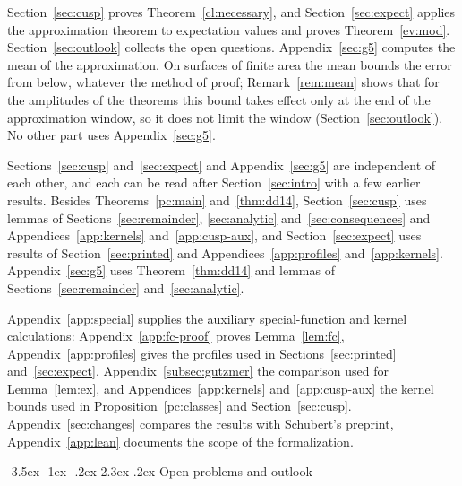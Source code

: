 \documentclass[twoside,10pt]{article}
\makeatletter
\numberwithin{equation}{section}
\theoremstyle{slbody}
\theoremstyle{remark}
\renewcommand{\section}{%
  \@startsection{section}{1}{\z@}%
    {-3.5ex \@plus -1ex \@minus -.2ex}%
    {2.3ex \@plus .2ex}%
    {\normalfont\large\bfseries}}
\makeatother
\begin{document}
Section~\ref{sec:cusp} proves Theorem~\ref{cl:necessary}, and Section~\ref{sec:expect} applies the approximation theorem to
expectation values and proves Theorem~\ref{ev:mod}. Section~\ref{sec:outlook} collects the open questions.
Appendix~\ref{sec:g5} computes the mean of the approximation. On surfaces of finite area the mean bounds the error from below,
whatever the method of proof; Remark~\ref{rem:mean} shows that for the amplitudes of the theorems this bound takes effect only at
the end of the approximation window, so it does not limit the window (Section~\ref{sec:outlook}). No other part uses
Appendix~\ref{sec:g5}.

Sections~\ref{sec:cusp} and~\ref{sec:expect} and Appendix~\ref{sec:g5} are independent of each other, and each can be read
after Section~\ref{sec:intro} with a few earlier results. Besides Theorems~\ref{pc:main} and~\ref{thm:dd14}, Section~\ref{sec:cusp}
uses lemmas of Sections~\ref{sec:remainder}, \ref{sec:analytic} and~\ref{sec:consequences} and Appendices~\ref{app:kernels}
and~\ref{app:cusp-aux}, and Section~\ref{sec:expect} uses results of Section~\ref{sec:printed} and Appendices~\ref{app:profiles} and~\ref{app:kernels}.
Appendix~\ref{sec:g5} uses Theorem~\ref{thm:dd14} and lemmas of Sections~\ref{sec:remainder} and~\ref{sec:analytic}.

Appendix~\ref{app:special} supplies the auxiliary special-function and kernel calculations: Appendix~\ref{app:fc-proof}
proves Lemma~\ref{lem:fc}, Appendix~\ref{app:profiles} gives the profiles used in Sections~\ref{sec:printed}
and~\ref{sec:expect}, Appendix~\ref{subsec:gutzmer} the comparison used for Lemma~\ref{lem:ex}, and
Appendices~\ref{app:kernels} and~\ref{app:cusp-aux} the kernel bounds used in Proposition~\ref{pc:classes} and
Section~\ref{sec:cusp}.
Appendix~\ref{sec:changes} compares the results with Schubert's preprint,
Appendix~\ref{app:lean} documents the scope of the formalization.









\section{Open problems and outlook}\label{sec:outlook}
\end{document}
